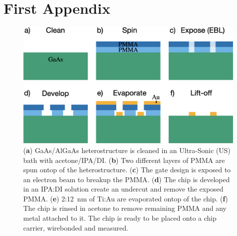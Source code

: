 \chapter{First Appendix}\label{cha:appendix1}


\begin{figure}[ht]
  \begin{center}
    \includegraphics[width=1.0\textwidth]{figures/appendix/crop_FiguresMaster.020.png}
    \caption[Step-by-step diagram for fabricating metal gates]{\label{fig:appx/gate_fab} 
    (\textbf{a}) GaAs/AlGaAs heterostructure is cleaned in an Ultra-Sonic (US) bath with acetone/IPA/DI. 
    (\textbf{b}) Two different layers of PMMA are spun ontop of the heterostructure.
    (\textbf{c}) The gate design is exposed to an electron beam to breakup the PMMA.
    (\textbf{d}) The chip is developed in an IPA:DI solution create an undercut and remove the exposed PMMA.
    (\textbf{e}) 2:\qty{12}{nm} of Ti:Au are evaporated ontop of the chip.
    (\textbf{f}) The chip is rinsed in acetone to remove remaining PMMA and any metal attached to it. The chip is ready to be placed onto a chip carrier, wirebonded and measured.}
  \end{center}
\end{figure}
